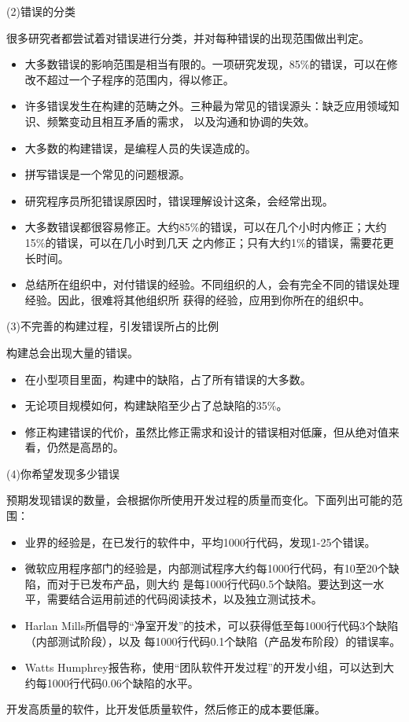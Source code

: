 \documentclass{article}
\begin{document}
\par
(2)错误的分类
\par
很多研究者都尝试着对错误进行分类，并对每种错误的出现范围做出判定。
\begin{itemize}
    \item 大多数错误的影响范围是相当有限的。一项研究发现，85\%的错误，可以在修改不超过一个子程序的范围内，得以修正。
    \item 许多错误发生在构建的范畴之外。三种最为常见的错误源头：缺乏应用领域知识、频繁变动且相互矛盾的需求，
    以及沟通和协调的失效。
    \item 大多数的构建错误，是编程人员的失误造成的。
    \item 拼写错误是一个常见的问题根源。
    \item 研究程序员所犯错误原因时，错误理解设计这条，会经常出现。
    \item 大多数错误都很容易修正。大约85\%的错误，可以在几个小时内修正；大约15\%的错误，可以在几小时到几天
    之内修正；只有大约1\%的错误，需要花更长时间。
    \item 总结所在组织中，对付错误的经验。不同组织的人，会有完全不同的错误处理经验。因此，很难将其他组织所
    获得的经验，应用到你所在的组织中。
\end{itemize}

\par
(3)不完善的构建过程，引发错误所占的比例
\par
构建总会出现大量的错误。
\begin{itemize}
    \item 在小型项目里面，构建中的缺陷，占了所有错误的大多数。
    \item 无论项目规模如何，构建缺陷至少占了总缺陷的35\%。
    \item 修正构建错误的代价，虽然比修正需求和设计的错误相对低廉，但从绝对值来看，仍然是高昂的。
\end{itemize}

\par
(4)你希望发现多少错误
\par
预期发现错误的数量，会根据你所使用开发过程的质量而变化。下面列出可能的范围：
\begin{itemize}
    \item 业界的经验是，在已发行的软件中，平均1000行代码，发现1-25个错误。
    \item 微软应用程序部门的经验是，内部测试程序大约每1000行代码，有10至20个缺陷，而对于已发布产品，则大约
    是每1000行代码0.5个缺陷。要达到这一水平，需要结合运用前述的代码阅读技术，以及独立测试技术。
    \item Harlan Mills所倡导的“净室开发”的技术，可以获得低至每1000行代码3个缺陷（内部测试阶段），以及
    每1000行代码0.1个缺陷（产品发布阶段）的错误率。
    \item Watts Humphrey报告称，使用“团队软件开发过程”的开发小组，可以达到大约每1000行代码0.06个缺陷的水平。
\end{itemize}
开发高质量的软件，比开发低质量软件，然后修正的成本要低廉。
\end{document}

